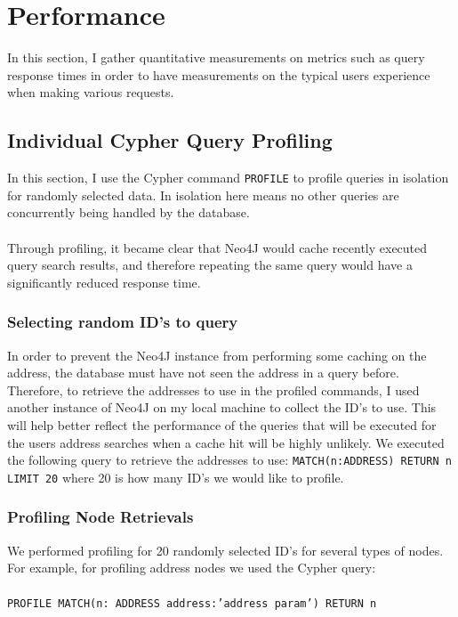 \section{Performance} 
In this section, I gather quantitative measurements on metrics such as query response times in order to have measurements on the typical users experience when making various requests. 

\subsection{Individual Cypher Query Profiling}
In this section, I use the Cypher command \texttt{PROFILE} to profile queries in isolation for randomly selected data. In isolation here means no other queries are concurrently being handled by the database.
\\\\
Through profiling, it became clear that Neo4J would cache recently executed query search results, and therefore repeating the same query would have a significantly reduced response time. 

\subsubsection{Selecting random ID's to query}
In order to prevent the Neo4J instance from performing some caching on the address, the database must have not seen the address in a query before. Therefore, to retrieve the addresses to use in the profiled commands, I used another instance of Neo4J on my local machine to collect the ID's to use. This will help better reflect the performance of the queries that will be executed for the users address searches when a cache hit will be highly unlikely. We executed the following query to retrieve the addresses to use: \texttt{MATCH(n:ADDRESS) RETURN n LIMIT 20} where 20 is how many ID's we would like to profile. 

\subsubsection{Profiling Node Retrievals}
We performed profiling for 20 randomly selected ID's for several types of nodes. For example, for profiling address nodes we used the Cypher query:
\\\\
\texttt{PROFILE MATCH(n: ADDRESS {address:'{address param}'}) RETURN n}

